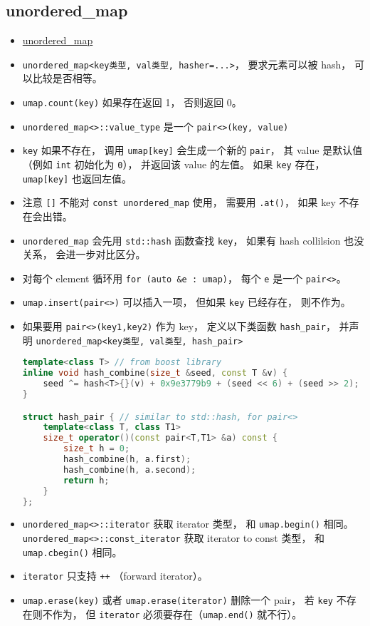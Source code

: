 \subsection{unordered\_map}
\begin{itemize}
\item \href{https://cplusplus.com/reference/unordered_map/unordered_map/}{unordered\_map}
\item \verb`unordered_map<key类型, val类型, hasher=...>`， 要求元素可以被 hash， 可以比较是否相等。
\item \verb`umap.count(key)` 如果存在返回 1， 否则返回 0。
\item \verb`unordered_map<>::value_type` 是一个 \verb`pair<>(key, value)`
\item \verb`key` 如果不存在， 调用 \verb`umap[key]` 会生成一个新的 \verb`pair`， 其 value 是默认值 （例如 \verb`int` 初始化为 \verb`0`）， 并返回该 value 的左值。 如果 \verb`key` 存在， \verb`umap[key]` 也返回左值。
\item 注意 \verb`[]` 不能对 \verb`const unordered_map` 使用， 需要用 \verb`.at()`， 如果 key 不存在会出错。
\item \verb`unordered_map` 会先用 \verb`std::hash` 函数查找 \verb`key`， 如果有 hash collilsion 也没关系， 会进一步对比区分。
\item 对每个 element 循环用 \verb`for (auto &e : umap)`， 每个 \verb`e` 是一个 \verb`pair<>`。
\item \verb`umap.insert(pair<>)` 可以插入一项， 但如果 \verb`key` 已经存在， 则不作为。
\item 如果要用 \verb`pair<>(key1,key2)` 作为 key， 定义以下类函数 \verb`hash_pair`， 并声明 \verb`unordered_map<key类型, val类型, hash_pair>`
\begin{lstlisting}[language=cpp]
template<class T> // from boost library
inline void hash_combine(size_t &seed, const T &v) {
    seed ^= hash<T>{}(v) + 0x9e3779b9 + (seed << 6) + (seed >> 2);
}

struct hash_pair { // similar to std::hash, for pair<>
    template<class T, class T1>
    size_t operator()(const pair<T,T1> &a) const {
        size_t h = 0;
        hash_combine(h, a.first);
        hash_combine(h, a.second);
        return h;
    }
};
\end{lstlisting}
\item \verb`unordered_map<>::iterator` 获取 iterator 类型， 和 \verb`umap.begin()` 相同。 \verb`unordered_map<>::const_iterator` 获取 iterator to const 类型， 和 \verb`umap.cbegin()` 相同。
\item \verb`iterator` 只支持 \verb`++` （forward iterator）。
\item \verb`umap.erase(key)` 或者 \verb`umap.erase(iterator)` 删除一个 pair， 若 \verb`key` 不存在则不作为， 但 \verb`iterator` 必须要存在（\verb`umap.end()` 就不行）。
\end{itemize}

